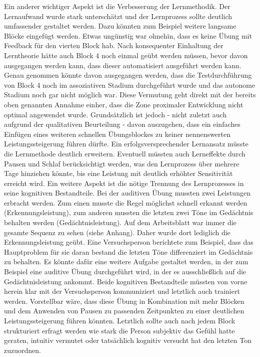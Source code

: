 \documentclass[doc,a4paper,12pt]{apa6}
\begin{document}
Ein anderer wichtiger Aspekt ist die Verbesserung der Lernmethodik. Der Lernaufwand wurde stark unterschätzt und der Lernprozess sollte deutlich umfassender gestaltet werden. Dazu könnten zum Beispiel weitere langsame Blöcke eingefügt werden. Etwas ungünstig war ohnehin, dass es keine Übung mit Feedback für den vierten Block hab. Nach konsequenter Einhaltung der Lerntheorie hätte auch Block 4 noch einmal geübt werden müssen, bevor davon ausgegangen werden kann, dass dieser automatisiert ausgeführt werden kann. Genau genommen könnte davon ausgegangen werden, dass die Testdurchführung von Block 4 noch im assoziativen Stadium durchgeführt wurde und das autonome Stadium noch gar nicht möglich war. Diese Vermutung geht direkt mit der bereits oben genannten Annahme einher, dass die Zone proximaler Entwicklung nicht optimal angewendet wurde. Grundsätzlich ist jedoch - nicht zuletzt auch aufgrund der qualitativen Beurteilung - davon auszugehen, dass ein einfaches Einfügen eines weiteren schnellen Übungsblockes zu keiner nennenswerten Leistungssteigerung führen dürfte. Ein erfolgsversprechender Lernansatz müsste die Lernmethode deutlich erweitern. Eventuell müssten auch Lerneffekte durch Pausen und Schlaf berücksichtigt werden, was den Lernprozess über mehrere Tage hinziehen könnte, bis eine Leistung mit deutlich erhöhter Sensitivität erreicht wird. Ein weitere Aspekt ist die nötige Trennung des Lernprozesses in seine kognitiven Bestandteile. Bei der auditiven Übung mussten zwei Leistungen erbracht werden. Zum einen musste die Regel möglichst schnell erkannt werden (Erkennungsleistung), zum anderen mussten die letzten zwei Töne im Gedächtnis behalten werden (Gedächtnisleistung). Auf dem Arbeitsblatt war immer die gesamte Sequenz zu sehen (siehe Anhang). Daher wurde dort lediglich die Erkennungsleistung geübt. Eine Versuchsperson berichtete zum Beispiel, dass das Hauptproblem für sie daran bestand die letzten Töne differenziert im Gedächtnis zu behalten. Es könnte dafür eine weitere Aufgabe gestaltet werden, in der zum Beispiel eine auditive Übung durchgeführt wird, in der es ausschließlich auf die Gedächtnisleistung ankommt. Beide kognitiven Bestandteile müssten von vorne herein klar mit der Versuchsperson kommuniziert und letztlich auch trainiert werden. Vorstellbar wäre, dass diese Übung in Kombination mit mehr Blöcken und dem Anwenden von Pausen zu passenden Zeitpunkten zu einer deutlichen Leistungssteigerung führen könnten. Letztlich sollte auch nach jedem Block strukturiert erfragt werden wie stark die Person subjektiv das Gefühl hatte geraten, intuitiv vermutet oder tatsächlich kognitiv versucht hat den letzten Ton zuzuordnen.
\end{document}
